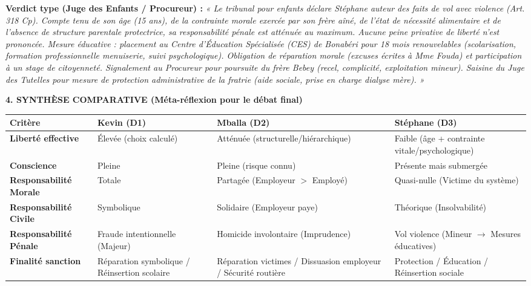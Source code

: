 \documentclass[11pt]{article}
\begin{document}
\begin{exoresolu}
\medskip
\noindent\textbf{Verdict type (Juge des Enfants / Procureur) :} \textit{« Le tribunal pour enfants déclare Stéphane auteur des faits de vol avec violence (Art. 318 Cp). Compte tenu de son âge (15 ans), de la contrainte morale exercée par son frère aîné, de l'état de nécessité alimentaire et de l'absence de structure parentale protectrice, sa responsabilité pénale est atténuée au maximum. Aucune peine privative de liberté n'est prononcée. Mesure éducative : placement au Centre d'Éducation Spécialisée (CES) de Bonabéri pour 18 mois renouvelables (scolarisation, formation professionnelle menuiserie, suivi psychologique). Obligation de réparation morale (excuses écrites à Mme Fouda) et participation à un stage de citoyenneté. Signalement au Procureur pour poursuite du frère Bebey (recel, complicité, exploitation mineur). Saisine du Juge des Tutelles pour mesure de protection administrative de la fratrie (aide sociale, prise en charge dialyse mère). »}

\bigskip
\noindent\textbf{4. SYNTHÈSE COMPARATIVE (Méta-réflexion pour le débat final)}

\begin{center}
\begin{tabularx}{\linewidth}{|l|X|X|X|}
\hline
\textbf{Critère} & \textbf{Kevin (D1)} & \textbf{Mballa (D2)} & \textbf{Stéphane (D3)} \\
\hline
\textbf{Liberté effective} & Élevée (choix calculé) & Atténuée (structurelle/hiérarchique) & Faible (âge + contrainte vitale/psychologique) \\
\hline
\textbf{Conscience} & Pleine & Pleine (risque connu) & Présente mais submergée \\
\hline
\textbf{Responsabilité Morale} & Totale & Partagée (Employeur $>$ Employé) & Quasi-nulle (Victime du système) \\
\hline
\textbf{Responsabilité Civile} & Symbolique & Solidaire (Employeur paye) & Théorique (Insolvabilité) \\
\hline
\textbf{Responsabilité Pénale} & Fraude intentionnelle (Majeur) & Homicide involontaire (Imprudence) & Vol violence (Mineur $\rightarrow$ Mesures éducatives) \\
\hline
\textbf{Finalité sanction} & Réparation symbolique / Réinsertion scolaire & Réparation victimes / Dissuasion employeur / Sécurité routière & Protection / Éducation / Réinsertion sociale \\
\hline
\end{tabularx}
\end{center}


\end{exoresolu}
\end{document}
